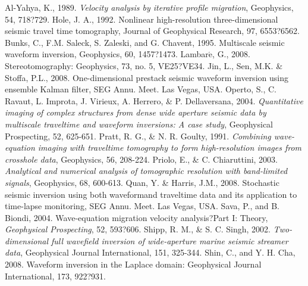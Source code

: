 \documentclass{gji}
\begin{document}
\begin{thebibliography}{}
 Al-Yahya, K., 1989. \textit{Velocity analysis by iterative profile migration}, Geophysics, 54, 718?729.
 Hole, J. A., 1992. Nonlinear high-resolution three-dimensional seismic travel time tomography, Journal of Geophysical Research, 97, 6553?6562.
 Bunks, C., F.M. Saleck, S. Zaleski, and G. Chavent, 1995. Multiscale seismic waveform inversion,  Geophysics, 60, 1457?1473.
 Lambar$\acute{\textrm{e}}$, G., 2008. Stereotomography: Geophysics, 73, no. 5, VE25?VE34.
 Jin, L., Sen, M.K. \& Stoffa, P.L., 2008. One-dimensional prestack seismic waveform inversion using ensemble Kalman filter, SEG Annu. Meet. Las Vegas, USA.
 Operto, S., C. Ravaut, L. Improta, J. Virieux, A. Herrero, \& P. Dellaversana, 2004. \textit{Quantitative imaging of complex structures from dense wide aperture seismic data by multiscale traveltime and waveform inversions: A case study}, Geophysical Prospecting, 52, 625-651.
 Pratt, R. G., \& N. R. Goulty, 1991. \textit{Combining wave-equation imaging with traveltime tomography to form high-resolution images from crosshole data}, Geophysics, 56, 208-224.
 Priolo, E., \& C. Chiaruttini, 2003. \textit{Analytical and numerical analysis of tomographic resolution with band-limited signals}, Geophysics, 68, 600-613.
 Quan, Y. \& Harris, J.M., 2008. Stochastic seismic inversion using both waveformand traveltime data and its application to time-lapse monitoring, SEG Annu. Meet. Las Vegas, USA.
 Sava, P., and B. Biondi, 2004. Wave-equation migration velocity analysis?Part I: Theory, \textit{Geophysical Prospecting}, 52, 593?606.
 Shipp, R. M., \& S. C. Singh, 2002. \textit{Two-dimensional full wavefield inversion of wide-aperture marine seismic streamer data}, Geophysical Journal International, 151, 325-344.
 Shin, C., and Y. H. Cha, 2008. Waveform inversion in the Laplace domain: Geophysical Journal International, 173, 922?931. 

\end{thebibliography}
\end{document}
